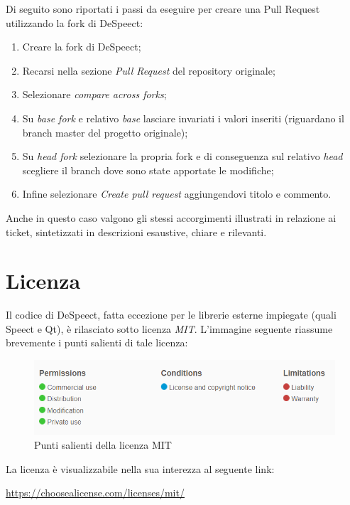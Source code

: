 \documentclass[openany,12pt,a4paper]{report}
\begin{document}
	Di seguito sono riportati i passi da eseguire per creare una Pull
	Request utilizzando la fork di DeSpeect:
	\begin{enumerate}
		\item Creare la fork di DeSpeect;
		\item Recarsi nella sezione \textit{Pull Request} del repository originale;
		\item Selezionare \textit{compare across forks};
		\item Su \textit{base fork} e relativo \textit{base} lasciare invariati i valori inseriti (riguardano il branch master del progetto originale);
		\item Su \textit{head fork} selezionare la propria fork e di conseguenza sul relativo \textit{head} scegliere
		il branch dove sono state apportate le modifiche;
		\item Infine selezionare \textit{Create pull request} aggiungendovi titolo e commento.
	\end{enumerate}
	Anche in questo caso valgono gli stessi accorgimenti illustrati in relazione ai ticket, sintetizzati in descrizioni esaustive, chiare e rilevanti.
	
	\chapter{Licenza}
	
	Il codice di DeSpeect, fatta eccezione per le librerie esterne impiegate (quali Speect e Qt), è rilasciato sotto licenza \textit{MIT}. L'immagine seguente riassume brevemente i punti salienti di tale licenza:
	
	\begin{figure}[H]
		\hspace*{-5mm}
		\includegraphics[scale=1]{licenza}
		\centering
		\caption{Punti salienti della licenza MIT}
	\end{figure}
	
	La licenza è visualizzabile nella sua interezza al seguente link:
	\begin{center}
		\url{https://choosealicense.com/licenses/mit/}
	\end{center} 
	
	\printglossaries
	
\end{document}
